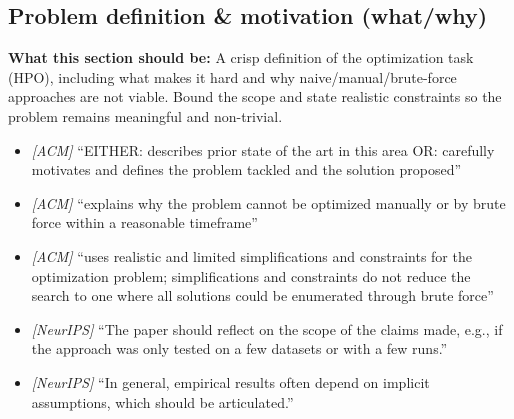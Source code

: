 \documentclass[11pt]{article}
\begin{document}
\subsection{Problem definition & motivation (what/why)}
\noindent\textbf{What this section should be:}
A crisp definition of the optimization task (HPO), including what makes it hard and why naive/manual/brute-force approaches are not viable. Bound the scope and state realistic constraints so the problem remains meaningful and non-trivial.
\begin{itemize}
  \item \textit{[ACM]} ``EITHER: describes prior state of the art in this area OR: carefully motivates and defines the problem tackled and the solution proposed''
  \item \textit{[ACM]} ``explains why the problem cannot be optimized manually or by brute force within a reasonable timeframe''
  \item \textit{[ACM]} ``uses realistic and limited simplifications and constraints for the optimization problem; simplifications and constraints do not reduce the search to one where all solutions could be enumerated through brute force''
  \item \textit{[NeurIPS]} ``The paper should reflect on the scope of the claims made, e.g., if the approach was only tested on a few datasets or with a few runs.''
  \item \textit{[NeurIPS]} ``In general, empirical results often depend on implicit assumptions, which should be articulated.''
\end{itemize}
\end{document}
